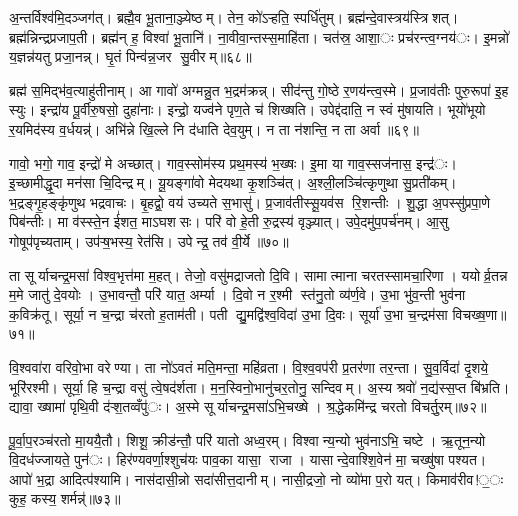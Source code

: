 अ॒न्तर्विश्व॑मि॒दञ्जग॑त्। ब्रह्मै॒व भू॒ताना॒ञ्ज्येष्ठम्। तेन॒ को॑ऽऱ्हति॒ स्पर्धि॑तुम्। ब्रह्म॑न्दे॒वास्त्रय॑स्त्रिशत्। ब्रह्म॑न्निन्द्रप्रजाप॒ती। ब्रह्म॑न् ह॒ विश्वा॑ भू॒तानि॑। ना॒वीवा॒न्तस्स॒माहि॑ता। चत॑स्र॒ आशा॒ः प्रच॑रन्त्व॒ग्नय॑ः। इ॒मन्नो॑ य॒ज्ञन्न॑यतु प्रजा॒नन्न्। घृ॒तं पिन्व॑न्न॒जर सु॒वीरम्॥६८॥

ब्रह्म॑ स॒मिद्भ॑व॒त्याहु॑तीनाम्। आ गावो॑ अग्मन्नु॒त भ॒द्रम॑क्रन्न्। सीद॑न्तु गो॒ष्ठे र॒णय॑न्त्व॒स्मे। प्र॒जाव॑तीः पुरु॒रूपा॑ इ॒ह स्युः। इन्द्रा॑य पू॒र्वीरु॒षसो॒ दुहा॑नाः। इन्द्रो॒ यज्व॑ने पृण॒ते च॑ शिख्षति। उपेद्द॑दाति॒ न स्वं मु॑षायति। भूयो॑भूयो र॒यमिद॑स्य व॒र्धयन्न्॑। अभि॑न्ने खि॒ल्ले नि द॑धाति देव॒युम्। न ता न॑शन्ति॒ न ता अर्वा॥६९॥

गावो॒ भगो॒ गाव॒ इन्द्रो॑ मे अच्छात्। गाव॒स्सोम॑स्य प्रथ॒मस्य॑ भ॒ख्षः। इ॒मा या गाव॒स्सज॑नास॒ इन्द्र॑ः। इ॒च्छामीद्धृ॒दा मन॑सा चि॒दिन्द्रम्। यू॒यङ्गा॑वो मेदयथा कृ॒शञ्चि॑त्। अ॒श्ली॒लञ्चि॑त्कृणुथा सु॒प्रती॑कम्। भ॒द्रङ्गृ॒हङ्कृ॑णुथ भद्रवाचः। बृ॒हद्वो॒ वय॑ उच्यते स॒भासु॑। प्र॒जाव॑तीस्सू॒यव॑स रि॒शन्तीः। शु॒द्धा अ॒पस्सु॑प्रपा॒णे पिब॑न्तीः। मा व॑स्स्ते॒न ई॑शत॒ माऽघशसः। परि॑ वो हे॒ती रु॒द्रस्य॑ वृञ्ज्यात्। उपे॒दमु॑प॒पर्च॑नम्। आ॒सु गोषूप॑पृच्यताम्। उप॑ऱ्ष॒भस्य॒ रेत॑सि। उपेन्द्र॒ तव॑ वी॒र्ये॥७०॥


ता सूर्याचन्द्र॒मसा॑ विश्व॒भृत्त॑मा म॒हत्। तेजो॒ वसु॑मद्राजतो दि॒वि। सामात्माना चरतस्सामचा॒रिणा। ययोर्व्र॒तन्न म॒मे जातु॑ दे॒वयोः। उ॒भावन्तौ॒ परि॑ यात॒ अर्म्या। दि॒वो न र॒श्मी स्त॑नु॒तो व्य॑र्ण॒वे। उ॒भा भु॑व॒न्ती भुव॑ना क॒विक्र॑तू। सूर्या॒ न च॒न्द्रा च॑रतो ह॒ताम॑ती। पती द्यु॒मद्वि॑श्व॒विदा॑ उ॒भा दि॒वः। सूर्या॑ उ॒भा च॒न्द्रम॑सा विचख्ष॒णा॥७१॥

वि॒श्ववा॑रा वरिवो॒भा वरेण्या। ता नो॑ऽवतं मति॒मन्ता॒ महि॑व्रता। वि॒श्व॒वप॑री प्र॒तर॑णा तर॒न्ता। सु॒व॒र्विदा॑ दृ॒शये॒ भूरि॑रश्मी। सूर्या॒ हि च॒न्द्रा वसु॑ त्वे॒षद॑र्शता। म॒न॒स्विनो॒भानु॑चर॒तोनु॒ सन्दिवम्। अ॒स्य श्रवो॑ न॒द्य॑स्स॒प्त बि॑भ्रति। द्यावा॒ ख्षामा॑ पृथि॒वी द॑ऱ्श॒तव्वँपु॑ः। अ॒स्मे सूर्याचन्द्र॒मसा॑ऽभि॒चख्षे। श्र॒द्धेकमि॑न्द्र चरतो विचर्तु॒रम्॥७२॥

पू॒र्वा॒प॒रञ्च॑रतो मा॒ययै॒तौ। शिशू॒ क्रीड॑न्तौ॒ परि॑ यातो अध्व॒रम्। विश्वान्य॒न्यो भुव॑नाऽभि॒ चष्टे। ऋ॒तून॒न्यो वि॒दध॑ज्जायते॒ पुन॑ः। हिर॑ण्यवर्णा॒श्शुच॑यः पाव॒का यासा॒ राजा। यासान्दे॒वाश्शि॒वेन॑ मा॒ चख्षु॑षा पश्यत। आपो॑ भ॒द्रा आदित्प॑श्यामि। नास॑दासी॒न्नो सदा॑सीत्त॒दानीम्। नासी॒द्रजो॒ नो व्यो॑मा प॒रो यत्। किमाव॑रीव!॒ः कुह॒ कस्य॒ शर्मन्न्॑॥७३॥

